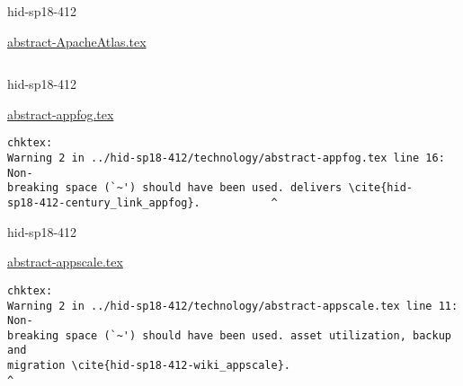 \begin{IU}

hid-sp18-412

\href{https://github.com/cloudmesh-community/hid-sp18-412/blob/master//technology/abstract-ApacheAtlas.tex}{abstract-ApacheAtlas.tex}

\begin{tiny}
\begin{verbatim}
\end{verbatim}
\end{tiny}
\end{IU}



\begin{IU}

hid-sp18-412

\href{https://github.com/cloudmesh-community/hid-sp18-412/blob/master//technology/abstract-appfog.tex}{abstract-appfog.tex}

\begin{tiny}
\begin{verbatim}
chktex:
Warning 2 in ../hid-sp18-412/technology/abstract-appfog.tex line 16: Non-
breaking space (`~') should have been used. delivers \cite{hid-
sp18-412-century_link_appfog}.           ^
\end{verbatim}
\end{tiny}
\end{IU}



\begin{IU}

hid-sp18-412

\href{https://github.com/cloudmesh-community/hid-sp18-412/blob/master//technology/abstract-appscale.tex}{abstract-appscale.tex}

\begin{tiny}
\begin{verbatim}
chktex:
Warning 2 in ../hid-sp18-412/technology/abstract-appscale.tex line 11: Non-
breaking space (`~') should have been used. asset utilization, backup and
migration \cite{hid-sp18-412-wiki_appscale}.
^
\end{verbatim}
\end{tiny}
\end{IU}



